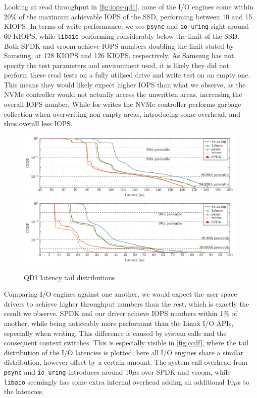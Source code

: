 Looking at read throughput in \autoref{fig:iops-qd1}, none of the I/O engines come within 20\% of the maximum achievable IOPS of the SSD, performing between 10 and 15 KIOPS. In terms of write performance, we see \texttt{psync} and \texttt{io\_uring} right around 60 KIOPS, while \texttt{libaio} performing considerably below the limit of the SSD. Both SPDK and vroom achieve IOPS numbers doubling the limit stated by Samsung, at 128 KIOPS and 126 KIOPS, respectively.
As Samsung has not specify the test parameters and environment used, it is likely they did not perform these read tests on a fully utilised drive and write test on an empty one. This means they would likely expect higher IOPS than what we observe, as the NVMe controller would not actually access the unwritten areas, increasing the overall IOPS number. While for writes the NVMe controller performs garbage collection when overwriting non-empty areas, introducing some overhead, and thus overall less IOPS.

\begin{figure}
  \centering
   {\includegraphics[width=\textwidth]{figures/latency-ccdf-read} \label{fig:ccdf-read}}
   {\includegraphics[width=\textwidth]{figures/latency-ccdf-write} \label{fig:ccdf-write}}
  \caption{QD1 latency tail distributions}
  \label{fig:ccdf}
\end{figure}

Comparing I/O engines against one another, we would expect the user space drivers to achieve higher throughput numbers than the rest, which is exactly the result we observe. SPDK and our driver achieve IOPS numbers within 1\% of another, while being noticeably more performant than the Linux I/O APIs, especially when writing. This difference is caused by system calls and the consequent context switches. This is especially visible in \autoref{fig:ccdf}, where the tail distribution of the I/O latencies is plotted; here all I/O engines share a similar distribution, however offset by a certain amount. The system call overhead from \texttt{psync} and \texttt{io\_uring} introduces around 10$\mu$s over SPDK and vroom, while \texttt{libaio} seemingly has some extra internal overhead adding an additional 10$\mu$s to the latencies.

